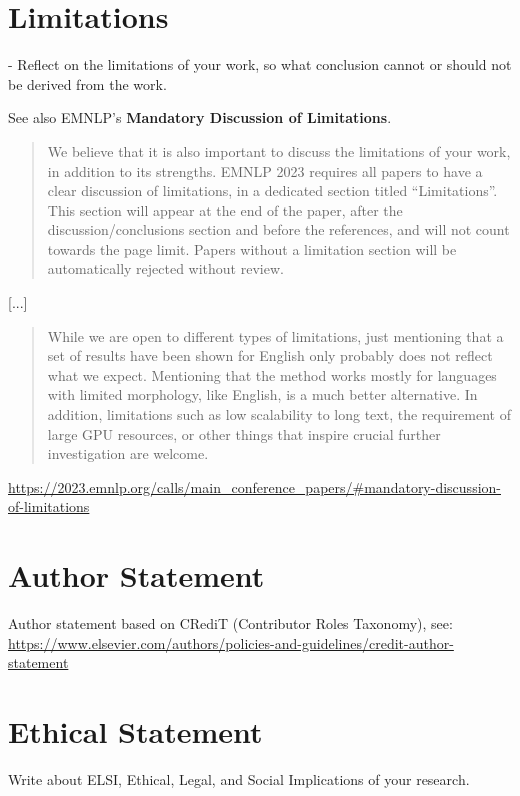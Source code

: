 \documentclass[sigconf, review, nonacm]{acmart}
\begin{document}
\section*{Limitations}

- Reflect on the limitations of your work, so what conclusion cannot or should not be derived from the work.

See also EMNLP's \textbf{Mandatory Discussion of Limitations}.

\begin{quote}
    We believe that it is also important to discuss the limitations of your work, in addition to its strengths. EMNLP 2023 requires all papers to have a clear discussion of limitations, in a dedicated section titled “Limitations”. This section will appear at the end of the paper, after the discussion/conclusions section and before the references, and will not count towards the page limit. Papers without a limitation section will be automatically rejected without review.
\end{quote}

[...]

\begin{quote}
While we are open to different types of limitations, just mentioning that a set of results have been shown for English only probably does not reflect what we expect. Mentioning that the method works mostly for languages with limited morphology, like English, is a much better alternative. In addition, limitations such as low scalability to long text, the requirement of large GPU resources, or other things that inspire crucial further investigation are welcome.
\end{quote}

\url{https://2023.emnlp.org/calls/main_conference_papers/#mandatory-discussion-of-limitations}


\section*{Author Statement}


Author statement based on CRediT (Contributor Roles Taxonomy), see: \url{https://www.elsevier.com/authors/policies-and-guidelines/credit-author-statement}


\section*{Ethical Statement}

Write about ELSI, \ie Ethical, Legal, and Social Implications of your research.
\end{document}
